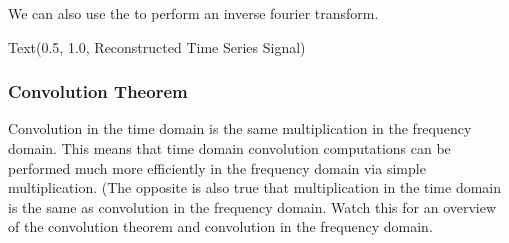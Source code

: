 \documentclass[letterpaper,10pt,english]{sphinxmanual}
\begin{document}
\noindent{}

We can also use the  to perform an inverse fourier transform.

\begin{sphinxVerbatim}[commandchars=\\\{\}]
 
 
 
 
 
\end{sphinxVerbatim}

\begin{sphinxVerbatim}[commandchars=\\\{\}]
Text(0.5, 1.0, \PYGZsq{}Reconstructed Time Series Signal\PYGZsq{})
\end{sphinxVerbatim}

\noindent{}


\subsubsection{Convolution Theorem}
\label{\detokenize{content/Signal_Processing:convolution-theorem}}
Convolution in the time domain is the same multiplication in the frequency domain. This means that time domain convolution computations can be performed much more efficiently in the frequency domain via simple multiplication. (The opposite is also true that multiplication in the time domain is the same as convolution in the frequency domain. Watch this  for an overview of the convolution theorem and convolution in the frequency domain.

\end{document}

